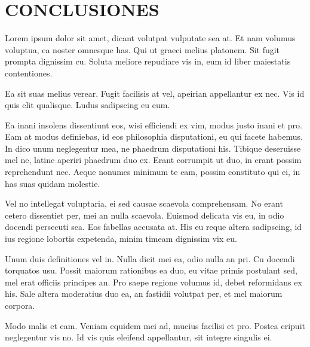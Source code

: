 \chapter*{\center \Large CONCLUSIONES} 

Lorem ipsum dolor sit amet, dicant volutpat vulputate sea at. Et nam volumus voluptua, ea noster omnesque has. Qui ut graeci melius platonem. Sit fugit prompta dignissim cu. Soluta meliore repudiare vis in, eum id liber maiestatis contentiones.

Ea sit suas melius verear. Fugit facilisis at vel, apeirian appellantur ex nec. Vis id quis elit qualisque. Ludus sadipscing eu eum.

Ea inani insolens dissentiunt eos, wisi efficiendi ex vim, modus justo inani et pro. Eam at modus definiebas, id eos philosophia disputationi, eu qui facete habemus. In dico unum neglegentur mea, ne phaedrum disputationi his. Tibique deseruisse mel ne, latine aperiri phaedrum duo ex. Erant corrumpit ut duo, in erant possim reprehendunt nec. Aeque nonumes minimum te eam, possim constituto qui ei, in has suas quidam molestie.

Vel no intellegat voluptaria, ei sed causae scaevola comprehensam. No erant cetero dissentiet per, mei an nulla scaevola. Euismod delicata vis eu, in odio docendi persecuti sea. Eos fabellas accusata at. His eu reque altera sadipscing, id ius regione lobortis expetenda, minim timeam dignissim vix eu.

Unum duis definitiones vel in. Nulla dicit mei ea, odio nulla an pri. Cu docendi torquatos usu. Possit maiorum rationibus ea duo, eu vitae primis postulant sed, mel erat officiis principes an. Pro saepe regione volumus id, debet reformidans ex his. Sale altera moderatius duo ea, an fastidii volutpat per, et mel maiorum corpora.

Modo malis et eam. Veniam equidem mei ad, mucius facilisi et pro. Postea eripuit neglegentur vis no. Id vis quis eleifend appellantur, sit integre singulis ei.